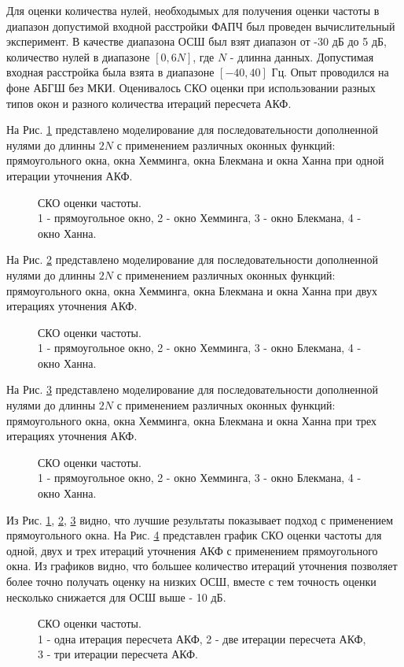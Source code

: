 Для оценки количества нулей, необходымых для получения оценки частоты в диапазон допустимой входной расстройки ФАПЧ был проведен вычислительный эксперимент. В качестве диапазона
ОСШ был взят диапазон от -30 дБ до 5 дБ, количество нулей в диапазоне ${[0, 6N]}$, где ${N}$ - длинна данных. Допустимая входная расстройка была взята в диапазоне ${[-40, 40]}$ Гц.
Опыт проводился на фоне АБГШ без МКИ. Оценивалось СКО оценки при использовании разных типов окон и разного количества итераций пересчета АКФ.

На Рис. \ref{pic:fft2_1} представлено моделирование для последовательности дополненной нулями до длинны ${2N}$ с применением различных оконных функций:
прямоугольного окна, окна Хемминга, окна Блекмана и окна Ханна при одной итерации уточнения АКФ.
\begin{figure}[h]
	\center{}
	\caption{СКО оценки частоты.\\1 - прямоугольное окно, 2 - окно Хемминга, 3 - окно Блекмана, 4 - окно Ханна.}
	\label{pic:fft2_1}
\end{figure}

На Рис. \ref{pic:fft2_2} представлено моделирование для последовательности дополненной нулями до длинны ${2N}$ с применением различных оконных функций:
прямоугольного окна, окна Хемминга, окна Блекмана и окна Ханна при двух итерациях уточнения АКФ.
\begin{figure}[h]
	\center{}
	\caption{СКО оценки частоты.\\1 - прямоугольное окно, 2 - окно Хемминга, 3 - окно Блекмана, 4 - окно Ханна.}
	\label{pic:fft2_2}
\end{figure}

На Рис. \ref{pic:fft2_3} представлено моделирование для последовательности дополненной нулями до длинны ${2N}$ с применением различных оконных функций:
прямоугольного окна, окна Хемминга, окна Блекмана и окна Ханна при трех итерациях уточнения АКФ.
\begin{figure}[h]
	\center{}
	\caption{СКО оценки частоты.\\1 - прямоугольное окно, 2 - окно Хемминга, 3 - окно Блекмана, 4 - окно Ханна.}
	\label{pic:fft2_3}
\end{figure}

Из Рис. \ref{pic:fft2_1}, \ref{pic:fft2_2}, \ref{pic:fft2_3} видно, что лучшие результаты показывает подход с применением прямоугольного окна. На Рис. \ref{pic:fft2_rect_1_2_3}
представлен график СКО оценки частоты для одной, двух и трех итераций уточнения АКФ с применением прямоугольного окна. Из графиков видно, что большее
количество итераций уточнения позволяет более точно получать оценку на низких ОСШ, вместе с тем точность оценки несколько снижается для ОСШ выше - 10 дБ.
\begin{figure}[h]
	\center{}
	\caption{СКО оценки частоты.\\1 - одна итерация пересчета АКФ, 2 - две итерации пересчета АКФ, 3 - три итерации пересчета АКФ.}
	\label{pic:fft2_rect_1_2_3}
\end{figure}

